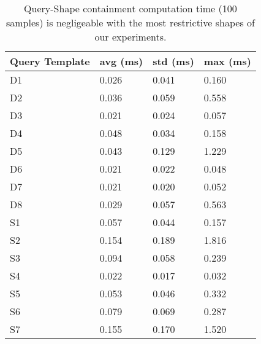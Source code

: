 \begin{table}
	\begin{center}
		\begin{tabular}{|l|l|l|l|}
			\hline
			Query Template & avg (ms) & std (ms) & max (ms) \\
			\hline
			D1 & 0.026 & 0.041 & 0.160 \\
			\hline
			D2 & 0.036 & 0.059 & 0.558 \\
			\hline
			D3 & 0.021 & 0.024 & 0.057 \\
			\hline
			D4 & 0.048 & 0.034 & 0.158 \\
			\hline
			D5 & 0.043 & 0.129 & 1.229 \\
			\hline
			D6 & 0.021 & 0.022 & 0.048 \\
			\hline
			D7 & 0.021 & 0.020 & 0.052 \\
			\hline
			D8 & 0.029 & 0.057 & 0.563 \\
			\hline
			S1 & 0.057 & 0.044 & 0.157 \\
			\hline
			S2 & 0.154 & 0.189 & 1.816 \\
			\hline
			S3 & 0.094 & 0.058 & 0.239 \\
			\hline
			S4 & 0.022 & 0.017 & 0.032 \\
			\hline
			S5 & 0.053 & 0.046 & 0.332 \\
			\hline
			S6 & 0.079 & 0.069 & 0.287 \\
			\hline
			S7 & 0.155 & 0.170 & 1.520 \\
			\hline
		\end{tabular}
	\end{center}
	\caption{Query-Shape containment computation time (100 samples) is negligeable with the most restrictive shapes of our experiments.}
	\label{tab:queryShapeContainmentEval}
\end{table}